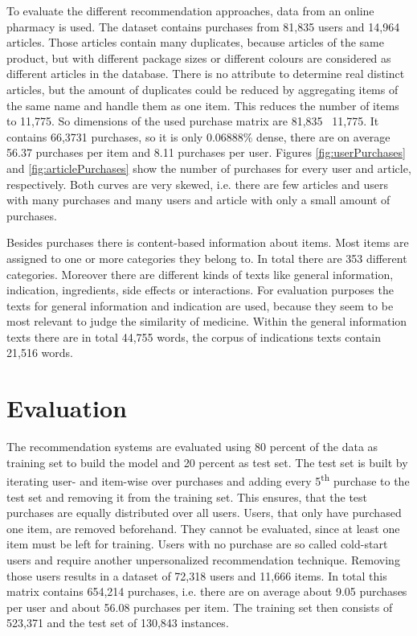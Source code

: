 \documentclass[10pt]{reportMaster}
\begin{document}
To evaluate the different recommendation approaches, data from an online pharmacy is used.
The dataset contains purchases from 81,835 users and 14,964 articles.
Those articles contain many duplicates, because articles of the same product, but with different package sizes or different colours are considered as different articles in the database.
There is no attribute to determine real distinct articles, but the amount of duplicates could be reduced by aggregating items of the same name and handle them as one item.
This reduces the number of items to 11,775.
So dimensions of the used purchase matrix are 81,835 \texttimes \ 11,775.
It contains 66,3731 purchases, so it is only 0.06888\% dense, there are on average 56.37 purchases per item and 8.11 purchases per user. %
Figures \ref{fig:userPurchases} and \ref{fig:articlePurchases} show the number of purchases for every user and article, respectively.
Both curves are very skewed, i.e. there are few articles and users with many purchases and many users and article with only a small amount of purchases.

Besides purchases there is content-based information about items.
Most items are assigned to one or more categories they belong to.
In total there are 353 different categories.
Moreover there are different kinds of texts like general information, indication, ingredients, side effects or interactions.
For evaluation purposes the texts for general information and indication are used, because they seem to be most relevant to judge the similarity of medicine.
Within the general information texts there are in total 44,755 words, the corpus of indications texts contain 21,516 words.


 \section{Evaluation}
\label{sec:eval}
The recommendation systems are evaluated using 80 percent of the data as training set to build the model and 20 percent as test set.
The test set is built by iterating user- and item-wise over purchases and adding every 5\textsuperscript{th} purchase to the test set and removing it from the training set.
This ensures, that the test purchases are equally distributed over all users.
Users, that only have purchased one item, are removed beforehand.
They cannot be evaluated, since at least one item must be left for training.
Users with no purchase are so called cold-start users and require another unpersonalized recommendation technique.
Removing those users results in a dataset of 72,318 users and 11,666 items.
In total this matrix contains 654,214 purchases, i.e. there are on average about 9.05 purchases per user and about 56.08 purchases per item.
The training set then consists of 523,371 and the test set of 130,843 instances.
\end{document}
